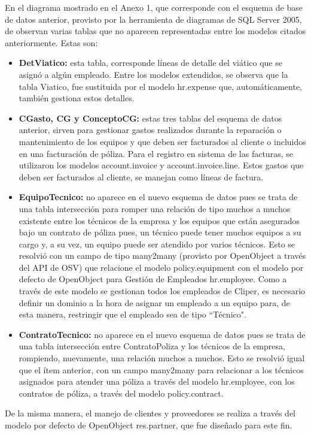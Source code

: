 \documentclass[a4paper, 12pt]{article}
\begin{document}
En el diagrama mostrado en el Anexo 1, que corresponde con el esquema de base de datos anterior, provisto por la herramienta de diagramas de SQL Server 2005, de observan varias tablas que no aparecen representadas entre los modelos citados anteriormente. Estas son:
\begin{itemize}
    \item \textbf{DetViatico:} esta tabla, corresponde líneas de detalle del viático que se asignó a algún empleado. Entre los modelos extendidos, se observa que la tabla Viatico, fue sustituida por el modelo hr.expense que, automáticamente, también gestiona estos detalles.
    \item \textbf{CGasto, CG y ConceptoCG:} estas tres tablas del esquema de datos anterior, sirven para gestionar gastos realizados durante la reparación o mantenimiento de los equipos y que deben ser facturados al cliente o incluidos en una facturación de póliza. Para el registro en sistema de las facturas, se utilizaron los modelos account.invoice y account.invoice.line. Estos gastos que deben ser facturados al cliente, se manejan como líneas de factura.
    \item \textbf{EquipoTecnico:} no aparece en el nuevo esquema de datos pues se trata de una tabla intersección para romper una relación de tipo muchos a muchos existente entre los técnicos de la empresa y los equipos que están asegurados bajo un contrato de póliza pues, un técnico puede tener muchos equipos a su cargo y, a su vez, un equipo puede ser atendido por varios técnicos. Esto se resolvió con un campo de tipo many2many (provisto por OpenObject a través del API de OSV) que relacione el modelo policy.equipment con el modelo por defecto de OpenObject para Gestión de Empleados hr.employee. Como a través de este modelo se gestionan todos los empleados de Cliper, es necesario definir un dominio a la hora de asignar un empleado a un equipo para, de esta manera, restringir que el empleado sea de tipo ``Técnico".
    \item \textbf{ContratoTecnico:} no aparece en el nuevo esquema de datos pues se trata de una tabla intersección entre ContratoPoliza y los técnicos de la empresa, rompiendo, nuevamente, una relación muchos a muchos. Esto se resolvió igual que el ítem anterior, con un campo many2many para relacionar a los técnicos asignados para atender una póliza a través del modelo hr.employee, con los contratos de póliza, a través del modelo policy.contract.
\end{itemize}

De la misma manera, el manejo de clientes y proveedores se realiza a través del modelo por defecto de OpenObject res.partner, que fue diseñado para este fin.
\end{document}
